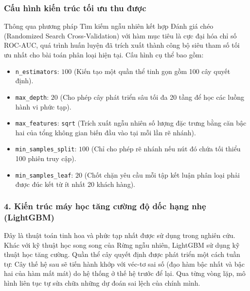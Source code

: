\documentclass[a4paper,11pt]{article}
\begin{document}
\subsubsection*{Cấu hình kiến trúc tối ưu thu được}
Thông qua phương pháp Tìm kiếm ngẫu nhiên kết hợp Đánh giá chéo (Randomized Search Cross-Validation) với hàm mục tiêu là cực đại hóa chỉ số ROC-AUC, quá trình huấn luyện đã trích xuất thành công bộ siêu tham số tối ưu nhất cho bài toán phân loại hiện tại. Cấu hình cụ thể bao gồm:

\begin{itemize}[itemsep=4pt, leftmargin=*]
    \item \texttt{n\_estimators}: $100$ (Kiến tạo một quần thể tinh gọn gồm 100 cây quyết định).
    \item \texttt{max\_depth}: $20$ (Cho phép cây phát triển sâu tối đa 20 tầng để học các luồng hành vi phức tạp).
    \item \texttt{max\_features}: \texttt{sqrt} (Trích xuất ngẫu nhiên số lượng đặc trưng bằng căn bậc hai của tổng không gian biến đầu vào tại mỗi lần rẽ nhánh).
    \item \texttt{min\_samples\_split}: $100$ (Chỉ cho phép rẽ nhánh nếu nút đó chứa tối thiểu 100 phiên truy cập).
    \item \texttt{min\_samples\_leaf}: $20$ (Chốt chặn yêu cầu mỗi tập kết luận phân loại phải được đúc kết từ ít nhất 20 khách hàng).
\end{itemize}

\subsubsection*{4. Kiến trúc máy học tăng cường độ dốc hạng nhẹ (LightGBM)}
Đây là thuật toán tinh hoa và phức tạp nhất được sử dụng trong nghiên cứu. Khác với kỹ thuật học song song của Rừng ngẫu nhiên, LightGBM sử dụng kỹ thuật học tăng cường. Quần thể cây quyết định được phát triển một cách tuần tự: Cây thế hệ sau sẽ tiến hành khớp với véc-tơ sai số (đạo hàm bậc nhất và bậc hai của hàm mất mát) do hệ thống ở thế hệ trước để lại. Qua từng vòng lặp, mô hình liên tục tự sửa chữa những dự đoán sai lệch của chính mình.
\end{document}
